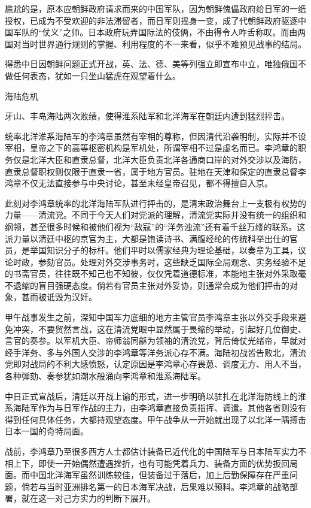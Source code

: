\documentclass[12pt,UTF8]{ctexbook}
\begin{document}
尴尬的是，原本应朝鲜政府请求而来的中国军队，因为朝鲜傀儡政府给日军的一纸授权，已成为不受欢迎的非法滞留者，而日军则摇身一变，成了代朝鲜政府驱逐中国军队的“仗义”之师。日本政府玩弄国际法的伎俩，不由得令人咋舌称叹。而由两国对当时世界通行规则的掌握、利用程度的不一来看，似乎不难预见战事的结局。

得悉中日因朝鲜问题正式开战，英、法、德、美等列强立即宣布中立，唯独俄国不做任何表态，犹如一只坐山猛虎在观望着什么。

海陆危机

牙山、丰岛海陆两次败绩，使得淮系陆军和北洋海军在朝廷内遭到猛烈抨击。

统率北洋淮系海陆军的李鸿章虽然有宰相的尊称，但因清代沿袭明制，实际并不设宰相，皇帝之下的高等枢密机构是军机处，所谓宰相不过是虚名而已。李鸿章的职务仅是北洋大臣和直隶总督，北洋大臣负责北洋各通商口岸的对外交涉以及海防，直隶总督职权则仅限于直隶一省，属于地方官员。驻地在天津和保定的直隶总督李鸿章不仅无法直接参与中央讨论，甚至未经皇帝召见，都不得擅自入京。

此刻对李鸿章统率的北洋海陆军队进行抨击的，是清末政治舞台上一支极有权势的力量——清流党。不同于今天人们对党派的理解，清流党实际并没有统一的组织和纲领，甚至很多时候和被他们视为“敌寇”的“洋务浊流”还有着千丝万缕的联系。这派力量以清廷中枢的京官为主，大都是饱读诗书、满腹经纶的传统科举出仕的官员，是举国知识分子的标杆。他们平时以儒家经典为理论基础，以奏章为工具，议论时政，参劾官员。处理对外交涉事务时，这些缺乏国际全局观念、实务经验不足的书斋官员，往往既不知己也不知彼，仅仅凭着道德标准，本能地主张对外采取毫不退缩的盲目强硬态度。倘若有官员主张对外妥协，则通常会成为他们抨击的对象，甚而被诋毁为汉奸。

甲午战事发生之前，深知中国军力底细的地方主管官员李鸿章主张以外交手段来避免冲突，不要贸然言战，这在清流党眼中显然属于畏缩的举动，引起好几位御史、言官的奏参。以军机大臣、帝师翁同龢为领袖的清流党，背后倚仗光绪帝，早就对经手洋务、多与外国人交涉的李鸿章等洋务派心存不满。海陆初战皆告败北，清流党即对战局的不利大感愤怒，认定原因是李鸿章心存畏葸、调度无方、用人不当，各种弹劾、奏参犹如潮水般涌向李鸿章和淮系海陆军。

中日正式宣战后，清廷以开战上谕的形式，进一步明确以驻扎在北洋海防线上的淮系海陆军作为与日军作战的主力，由李鸿章直接负责指挥、调遣。其他各省则没有得到任何具体任务，大都持观望态度。甲午战争从一开始就出现了以北洋一隅搏击日本一国的奇特局面。

战前，李鸿章乃至很多西方人士都估计装备已近代化的中国陆军与日本陆军实力不相上下，即使一开始偶然遭遇挫折，也有可能凭着兵力、装备方面的优势扳回局面。而中国北洋海军虽然训练较佳，但装备过于落后，加上后勤保障存在严重问题，倘若与当时亚洲排名第一的日本海军决战，后果难以预料。李鸿章的战略部署，就在这一对己方实力的判断下展开。
\end{document}
